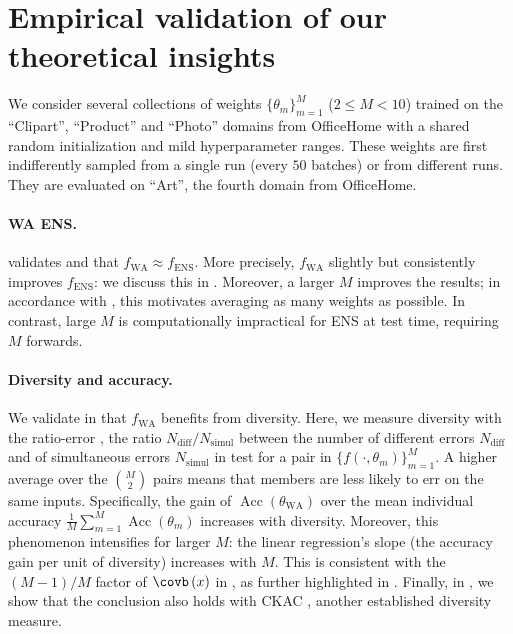 \section{Empirical validation of our theoretical insights}
\label{sect:analysis}
We consider several collections of weights $\{\theta_{m}\}_{m=1}^M$ ($2\leq M < 10$) trained on the \enquote{Clipart}, \enquote{Product} and \enquote{Photo} domains from OfficeHome \cite{venkateswara2017deep} with a shared random initialization and mild hyperparameter ranges.
These weights are first indifferently sampled from a single run (every $50$ batches) or from different runs.
They are evaluated on \enquote{Art}, the fourth domain from OfficeHome.%


\paragraph{WA \versus ENS.}
 validates  and that \textbf{$f_{\text{WA}} \approx f_{\text{ENS}}$}. 
More precisely, $f_{\text{WA}}$ slightly but consistently improves $f_{\text{ENS}}$: we discuss this in .
Moreover, a larger $M$ improves the results; in accordance with , this motivates averaging as many weights as possible.
In contrast, large $M$ is computationally impractical for ENS at test time, requiring $M$ forwards.%

\paragraph{Diversity and accuracy.}
We validate in  that $f_{\text{WA}}$ benefits from diversity.
Here, we measure diversity with the ratio-error \cite{aksela2003comparison}, \ie the ratio $N_{\text{diff}}/N_{\text{simul}}$ between the number of different errors $N_{\text{diff}}$ and of simultaneous errors $N_{\text{simul}}$ in test for a pair in $\{f\left(\cdot, \theta_{m}\right)\}_{m=1}^M$.
A higher average over the $\binom{M}{2}$ pairs means that members are less likely to err on the same inputs.
Specifically, the gain of $\operatorname{Acc}(\theta_{\text{WA}})$ over the mean individual accuracy $\frac{1}{M}\sum_{m=1}^M\operatorname{Acc}\left(\theta_m\right)$ increases with diversity.
Moreover, this phenomenon intensifies for larger $M$: the linear regression's slope (\ie the accuracy gain per unit of diversity) increases with $M$. This is consistent with the $(M-1)/M$ factor of $\covb\left(x\right)$ in , as further highlighted in .
Finally, in , we show that the conclusion also holds with CKAC \cite{DBLP:journals/corr/abs-1905-00414}, another established diversity measure.

